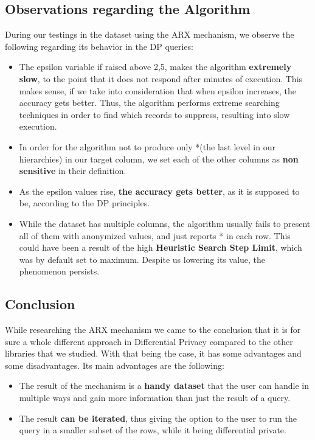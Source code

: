 \subsection{Observations regarding the Algorithm}

During our testings in the dataset using the ARX mechanism, we observe the following regarding its behavior in the DP queries:

\begin{itemize}
    \item The epsilon variable if raised above 2,5, makes the algorithm \textbf{extremely slow}, to the point that it does not respond after minutes of execution. This makes sense, if we take into consideration that when epsilon increases, the accuracy gets better. Thus, the algorithm performs extreme searching techniques in order to find which records to suppress, resulting into slow execution.
    \item In order for the algorithm not to produce only *(the last level in our hierarchies) in our target column, we set each of the other columns as \textbf{non sensitive} in their definition.
    \item As the epsilon values rise, \textbf{the accuracy gets better}, as it is supposed to be, according to the DP principles.
    \item While the dataset has multiple columns, the algorithm usually fails to present all of them with anonymized values, and just reports * in each row. This could have been a result of the high \textbf{Heuristic Search Step Limit}, which was by default set to maximum. Despite us lowering its value, the phenomenon persists.
\end{itemize}

\subsection{Conclusion}

While researching the ARX mechanism we came to the conclusion that it is for sure a whole different approach in Differential Privacy compared to the other libraries that we studied. With that being the case, it has some advantages and some disadvantages. Its main advantages are the following:

\begin{itemize}
    \item The result of the mechanism is a \textbf{handy dataset} that the user can handle in multiple ways and gain more information than just the result of a query.
    \item The result \textbf{can be iterated}, thus giving the option to the user to run the query in a smaller subset of the rows, while it being differential private.

\end{itemize}

